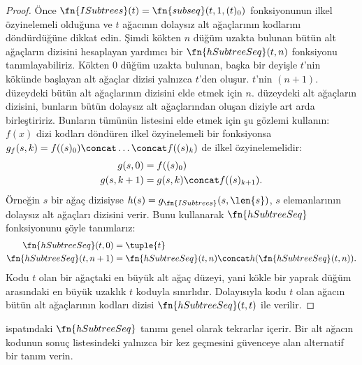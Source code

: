 \documentclass[../../../include/open-logic-section]{subfiles}
\begin{document}
\begin{proof}
  Önce $\fn{ISubtrees}(t)=\fn{subseq}(t,1,(t)_0)$ fonksiyonunun ilkel
  özyinelemeli olduğuna ve $t$ ağacının dolaysız alt ağaçlarının kodlarını
  döndürdüğüne dikkat edin. Şimdi kökten $n$ düğüm uzakta bulunan bütün alt
  ağaçların dizisini hesaplayan yardımcı bir $\fn{hSubtreeSeq}(t,n)$
  fonksiyonu tanımlayabiliriz. Kökten $0$ düğüm uzakta bulunan, başka bir
  deyişle $t$'nin kökünde başlayan alt ağaçlar dizisi yalnızca $t$'den
  oluşur. $t$'nin $(n+1)$. düzeydeki bütün alt ağaçlarının dizisini elde
  etmek için $n$. düzeydeki alt ağaçların dizisini, bunların bütün dolaysız
  alt ağaçlarından oluşan diziyle art arda birleştiririz. Bunların tümünün
  listesini elde etmek için şu gözlemi kullanın: $f(x)$ dizi kodları döndüren
  ilkel özyinelemeli bir fonksiyonsa
  $g_f(s,k)=f((s)_0)\concat\dots\concat f((s)_k)$ de ilkel
  özyinelemelidir:
  \begin{align*}
    g(s,0) & = f((s)_0)\\
    g(s,k+1) & = g(s,k)\concat f((s)_{k+1}).
  \end{align*}
  Örneğin $s$ bir ağaç dizisiyse
  $h(s)=g_{\fn{ISubtrees}}(s,\len{s})$, $s$ elemanlarının dolaysız alt
  ağaçları dizisini verir. Bunu kullanarak $\fn{hSubtreeSeq}$ fonksiyonunu
  şöyle tanımlarız:
  \begin{align*}
    \fn{hSubtreeSeq}(t,0) & = \tuple{t}\\
    \fn{hSubtreeSeq}(t,n+1) & =
      \fn{hSubtreeSeq}(t,n)\concat h(\fn{hSubtreeSeq}(t,n)).
  \end{align*}
  Kodu $t$ olan bir ağaçtaki en büyük alt ağaç düzeyi, yani kökle bir yaprak
  düğüm arasındaki en büyük uzaklık $t$ koduyla sınırlıdır. Dolayısıyla kodu
  $t$ olan ağacın bütün alt ağaçlarının kodları dizisi
  $\fn{hSubtreeSeq}(t,t)$ ile verilir.
\end{proof}

\begin{prob}
   ispatındaki
  $\fn{hSubtreeSeq}$ tanımı genel olarak tekrarlar içerir. Bir alt ağacın
  kodunun sonuç listesindeki yalnızca bir kez geçmesini güvenceye alan
  alternatif bir tanım verin.
\end{prob}
\end{document}
